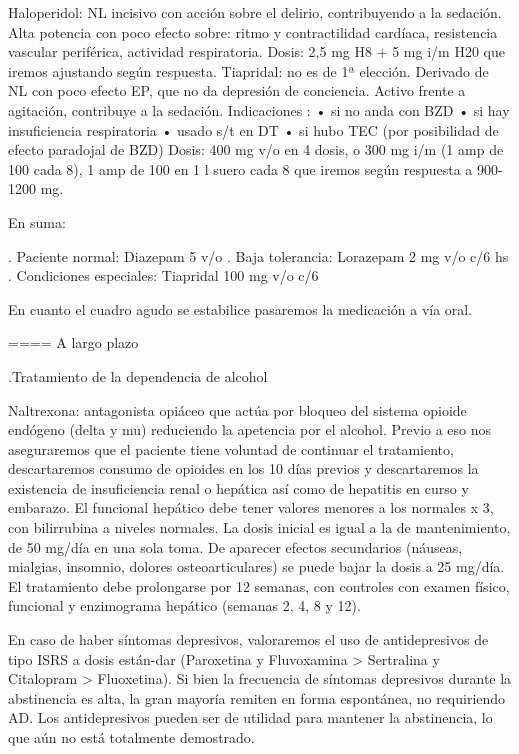 \documentclass{scrbook}
\begin{document}
Haloperidol: NL incisivo con acción sobre el delirio, contribuyendo a la sedación. Alta potencia con poco efecto sobre: ritmo y contractilidad cardíaca, resistencia vascular periférica, actividad respiratoria. Dosis: 2,5 mg H8 + 5 mg i/m H20 que iremos ajustando según respuesta.
Tiapridal: no es de 1ª elección. Derivado de NL con poco efecto EP, que no da depresión de conciencia. Activo frente a agitación, contribuye a la sedación. Indicaciones : • si no anda con BZD • si hay insuficiencia respiratoria • usado s/t en DT • si hubo TEC (por posibilidad de efecto paradojal de BZD) Dosis: 400 mg v/o en 4 dosis, o 300 mg i/m (1 amp de 100 cada 8), 1 amp de 100 en 1 l suero cada 8 que iremos según respuesta a 900-1200 mg.

En suma:

. Paciente normal: Diazepam 5 v/o
. Baja tolerancia: Lorazepam 2 mg v/o c/6 hs
. Condiciones especiales: Tiapridal 100 mg v/o c/6

En cuanto el cuadro agudo se estabilice pasaremos la medicación a vía oral.

==== A largo plazo

.Tratamiento de la dependencia de alcohol

Naltrexona: antagonista opiáceo que actúa por bloqueo del sistema opioide endógeno (delta y mu) reduciendo la apetencia por el alcohol. Previo a eso nos aseguraremos que el paciente tiene voluntad de continuar el tratamiento, descartaremos consumo de opioides en los 10 días previos y descartaremos la existencia de insuficiencia renal o hepática así como de hepatitis en curso y embarazo. El funcional hepático debe tener valores menores a los normales x 3, con bilirrubina a niveles normales. La dosis inicial es igual a la de mantenimiento, de 50 mg/día en una sola toma. De aparecer efectos secundarios (náuseas, mialgias, insomnio, dolores osteoarticulares) se puede bajar la dosis a 25 mg/día. El tratamiento debe prolongarse por 12 semanas, con controles con examen físico, funcional y enzimograma hepático (semanas 2, 4, 8 y 12).

En caso de haber síntomas depresivos, valoraremos el uso de antidepresivos de tipo ISRS a dosis están-dar (Paroxetina y Fluvoxamina > Sertralina y Citalopram > Fluoxetina). Si bien la frecuencia de síntomas depresivos durante la abstinencia es alta, la gran mayoría remiten en forma espontánea, no requiriendo AD. Los antidepresivos pueden ser de utilidad para mantener la abstinencia, lo que aún no está totalmente demostrado.
\end{document}

